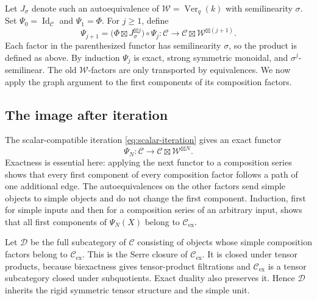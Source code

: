 Let $J_\sigma$ denote such an autoequivalence of
$\mathcal W=\operatorname{Ver}_{q}(k)$ with semilinearity $\sigma$.
Set $\Psi_0=\operatorname{Id}_{\mathcal C}$ and $\Psi_1=\Phi$.
For $j\geq1$, define
\begin{equation}\label{eq:scalar-iteration}
 \Psi_{j+1}
 =\bigl(\Phi\boxtimes J_\sigma^{\boxtimes j}\bigr)\circ\Psi_j:
 \mathcal C\longrightarrow\mathcal C\boxtimes\mathcal W^{\boxtimes(j+1)}.
\end{equation}
Each factor in the parenthesized functor has semilinearity $\sigma$,
so the product is defined as above.  By induction $\Psi_j$ is exact,
strong symmetric monoidal, and $\sigma^j$-semilinear.
The old $\mathcal W$-factors are only transported by equivalences.
We now apply the graph argument to the first components of its
composition factors.


\subsection{The image after iteration}

The scalar-compatible iteration \eqref{eq:scalar-iteration} gives an exact functor
\[
 \Psi_N:\mathcal C\longrightarrow
 \mathcal C\boxtimes\mathcal W^{\boxtimes N}.
\]
Exactness is essential here: applying the next functor to a composition
series shows that every first component of every composition factor
follows a path of one additional edge.  The autoequivalences on the other
factors send simple objects to simple objects and do not change the first
component.  Induction, first for simple inputs and then for a composition
series of an arbitrary input, shows that all first components of
\(\Psi_N(X)\) belong to \(\mathcal C_{\mathrm{ex}}\).

Let \(\mathcal D\) be the full subcategory of \(\mathcal C\) consisting
of objects whose simple composition factors belong to
\(\mathcal C_{\mathrm{ex}}\).  This is the Serre closure of
\(\mathcal C_{\mathrm{ex}}\).  It is closed under tensor products, because
biexactness gives tensor-product filtrations and
\(\mathcal C_{\mathrm{ex}}\) is a tensor subcategory closed under
subquotients.  Exact duality also preserves it.  Hence \(\mathcal D\)
inherits the rigid symmetric tensor structure and the simple unit.

